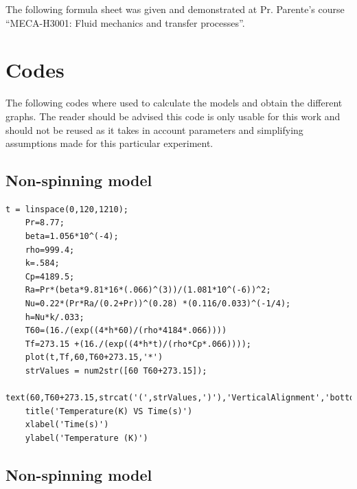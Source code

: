 \documentclass{report}
\begin{document}
	The following formula sheet was given and demonstrated at Pr. Parente's course ``MECA-H3001: Fluid mechanics and transfer processes''.
	
	
	
	\chapter{Codes}
	
	The following codes where used to calculate the models and obtain the different graphs. The reader should be advised this code is only usable for this work and should not be reused as it takes in account parameters and simplifying assumptions made for this particular experiment.
	
	\section{Non-spinning model}\label{codeNS}
	
	\begin{lstlisting}[style=Matlab-editor]
	t = linspace(0,120,1210);
	Pr=8.77;
	beta=1.056*10^(-4);
	rho=999.4;
	k=.584;
	Cp=4189.5;
	Ra=Pr*(beta*9.81*16*(.066)^(3))/(1.081*10^(-6))^2;
	Nu=0.22*(Pr*Ra/(0.2+Pr))^(0.28) *(0.116/0.033)^(-1/4);
	h=Nu*k/.033;
	T60=(16./(exp((4*h*60)/(rho*4184*.066))))
	Tf=273.15 +(16./(exp((4*h*t)/(rho*Cp*.066))));
	plot(t,Tf,60,T60+273.15,'*')
	strValues = num2str([60 T60+273.15]);
	text(60,T60+273.15,strcat('(',strValues,')'),'VerticalAlignment','bottom');
	title('Temperature(K) VS Time(s)')
	xlabel('Time(s)')
	ylabel('Temperature (K)')
	\end{lstlisting}
	
	\section{Non-spinning model}\label{codeS}
	
\end{document}
